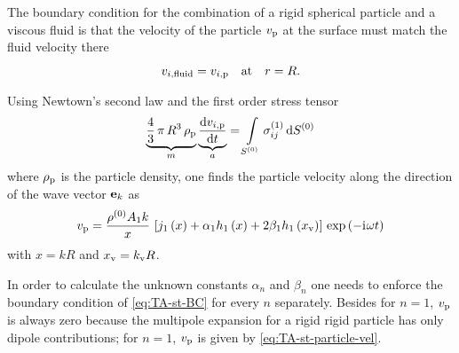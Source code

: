 The boundary condition for the combination of a rigid spherical particle and a 
viscous fluid is that the velocity of the particle $v_{\mathrm{p}}$ at the 
surface must match the fluid velocity there
\begin{equation}
  v_{i,\mathrm{fluid}} = v_{i,\mathrm{p}}\quad\text{at}\quad r = R.
  \label{eq:TA-st-BC}
\end{equation}

Using Newtown's second law and the first order stress tensor
\begin{equation}
  \underbrace{\frac{4}{3}\,\pi\,R^{3}\,\rho_{\mathrm{p}}}_{m}
  \underbrace{\dv{v_{i,\mathrm{p}}}{t}}_{a} = 
  \int\limits_{S^{(0)}}\sigma_{ij}^{(1)}\dd{  S^{(0)}  }
  \label{eq:TA-st-newton}
\end{equation}
where $\rho_{\mathrm{p}}$ is the particle density, one finds the particle 
velocity along the direction of the wave vector $\vb{e}_{k}$ as
\begin{equation}
  v_{\mathrm{p}} = \frac{\rho^{(0)}A_{1}k}{x}\,
  \left[
    j_{1}\left(x\right) + \alpha_{1}h_{1}\left(x\right) + 2\beta_{1}h_{1}\left(x_{\mathrm{v}}\right)
  \right]
  \,\exp\left( -\mathrm{i}\mkern1mu\omega t \right)
  \label{eq:TA-st-particle-vel}
\end{equation}
with $x=kR$ and $x_{\mathrm{v}}=k_{\mathrm{v}}R$.

In order to calculate the unknown constants $\alpha_{n}$ and $\beta_{n}$ one 
needs to enforce the boundary condition of \cref{eq:TA-st-BC} for every $n$ 
separately. Besides for $n=1$, $v_{\mathrm{p}}$ is always zero because the 
multipole expansion for a rigid rigid particle has only dipole contributions; 
for $n=1$, $v_{\mathrm{p}}$ is given by \cref{eq:TA-st-particle-vel}.

